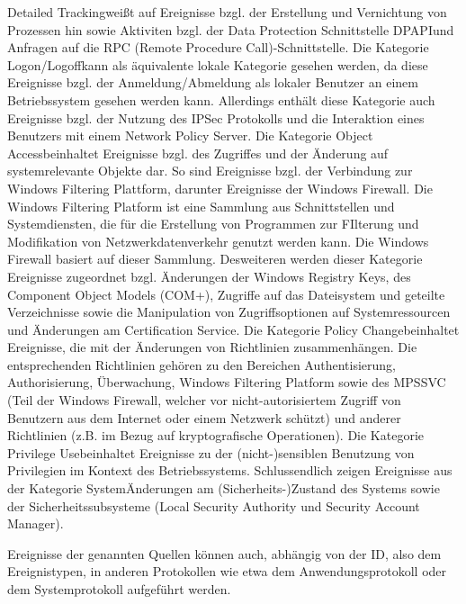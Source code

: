 \glqq Detailed Tracking\grqq  weißt auf Ereignisse bzgl. der Erstellung und Vernichtung von Prozessen hin sowie Aktiviten bzgl. der Data Protection Schnittstelle \glqq DPAPI\grqq  und Anfragen auf die RPC (Remote Procedure Call)-Schnittstelle.
Die Kategorie \glqq Logon/Logoff\grqq  kann als äquivalente lokale Kategorie gesehen werden, da diese Ereignisse bzgl. der Anmeldung/Abmeldung als lokaler Benutzer an einem Betriebssystem gesehen werden kann. Allerdings enthält diese Kategorie auch Ereignisse bzgl. der Nutzung des IPSec Protokolls und die Interaktion eines Benutzers mit einem Network Policy Server. 
Die Kategorie \glqq Object Access\grqq  beinhaltet Ereignisse bzgl. des Zugriffes und der Änderung auf systemrelevante Objekte dar. So sind Ereignisse bzgl. der Verbindung zur Windows Filtering Plattform, darunter Ereignisse der Windows Firewall. Die Windows Filtering Platform ist eine Sammlung aus Schnittstellen und Systemdiensten, die für die Erstellung von Programmen zur FIlterung und Modifikation von Netzwerkdatenverkehr genutzt werden kann. Die Windows Firewall basiert auf dieser Sammlung.
Desweiteren werden dieser Kategorie Ereignisse zugeordnet bzgl. Änderungen der Windows Registry Keys, des Component Object Models (COM+), Zugriffe auf das Dateisystem und geteilte Verzeichnisse sowie die Manipulation von Zugriffsoptionen auf Systemressourcen und Änderungen am Certification Service.
Die Kategorie \glqq Policy Change\grqq  beinhaltet Ereignisse, die mit der Änderungen von Richtlinien zusammenhängen. Die entsprechenden Richtlinien gehören zu den Bereichen Authentisierung, Authorisierung, Überwachung, Windows Filtering Platform sowie des MPSSVC (Teil der Windows Firewall, welcher vor nicht-autorisiertem Zugriff von Benutzern aus dem Internet oder einem Netzwerk schützt) und anderer Richtlinien (z.B. im Bezug auf kryptografische Operationen). %
Die Kategorie \glqq Privilege Use\grqq  beinhaltet Ereignisse zu der (nicht-)sensiblen Benutzung von Privilegien im Kontext des Betriebssystems. 
Schlussendlich zeigen Ereignisse aus der Kategorie \glqq System\grqq  Änderungen am (Sicherheits-)Zustand des Systems sowie der Sicherheitssubsysteme (Local Security Authority und Security Account Manager).

Ereignisse der genannten Quellen können auch, abhängig von der ID, also dem Ereignistypen, in anderen Protokollen wie etwa dem Anwendungsprotokoll oder dem Systemprotokoll aufgeführt werden.

